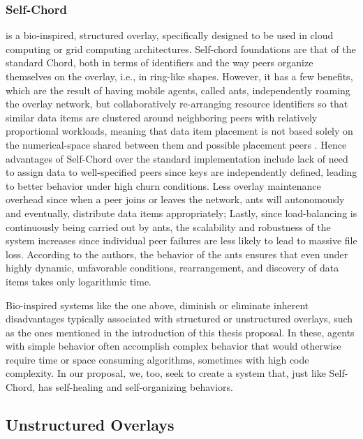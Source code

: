 \documentclass[runningheads]{llncs}
\begin{document}
\subsubsection{Self-Chord} \cite{selfchord} is a bio-inspired, structured overlay, specifically designed to be used in cloud computing or grid computing architectures. Self-chord foundations are that of the standard Chord, both in terms of identifiers and the way peers organize themselves on the overlay, i.e., in ring-like shapes. However, it has a few benefits, which are the result of having mobile agents, called ants, independently roaming the overlay network, but collaboratively re-arranging resource identifiers so that similar data items are clustered around neighboring peers with relatively proportional workloads, meaning that data item placement is not based solely on the numerical-space shared between them and possible placement peers \cite{sotart, selfchord}. Hence advantages of Self-Chord over the standard implementation include lack of need to assign data to well-specified peers since keys are independently defined, leading to better behavior under high churn conditions. Less overlay maintenance overhead since when a peer joins or leaves the network, ants will autonomously and eventually, distribute data items appropriately; Lastly, since load-balancing is continuously being carried out by ants, the scalability and robustness of the system increases since individual peer failures are less likely to lead to massive file loss. According to the authors, the behavior of the ants ensures that even under highly dynamic, unfavorable conditions, rearrangement, and discovery of data items takes only logarithmic time.

Bio-inspired systems like the one above, diminish or eliminate inherent disadvantages typically associated with structured or unstructured overlays, such as the ones mentioned in the introduction of this thesis proposal. In these, agents with simple behavior often accomplish complex behavior that would otherwise require time or space consuming algorithms, sometimes with high code complexity. In our proposal, we, too, seek to create a system that, just like Self-Chord, has self-healing and self-organizing behaviors.

\newpage\subsection{Unstructured Overlays}
\end{document}
